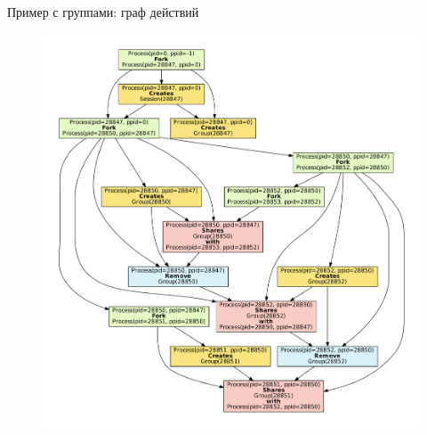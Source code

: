 \begin{frame}{Пример с группами: граф действий}
	\begin{figure}[ht!]
	\centering
	\includegraphics[scale=0.23]{fig/exampleActGraph.pdf}
	\end{figure}
\end{frame}

